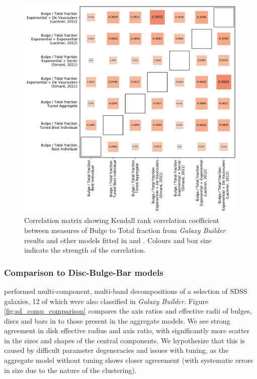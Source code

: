 \documentclass[../main.tex]{subfiles}
\begin{document}
\begin{figure}
  \includegraphics[width=17cm]{images__results/b-t_comparison_correlation.pdf}
  \caption{Correlation matrix showing Kendall rank correlation coefficient between measures of Bulge to Total fraction from \textit{Galaxy Builder} results and other models fitted in \citet{2011ApJS..196...11S} and \citet{2012MNRAS.421.2277L}. Colours and box size indicate the strength of the correlation.}
  \label{fig:bt_correlation}
\end{figure}


\subsubsection{Comparison to Disc-Bulge-Bar models}

\citet{2018MNRAS.473.4731K} performed multi-component, multi-band decompositions of a selection of SDSS galaxies, 12 of which were also classified in \textit{Galaxy Builder}. Figure \ref{fig:sd_comp_comparison} compares the axis ratios and effective radii of bulges, discs and bars in \citet{2018MNRAS.473.4731K} to those present in the aggregate models. We see strong agreement in disk effective radius and axis ratio, with significantly more scatter in the sizes and shapes of the central components. We hypothesize that this is caused by difficult parameter degeneracies and issues with tuning, as the aggregate model without tuning shows closer agreeement (with systematic errors in size due to the nature of the clustering).
\end{document}
